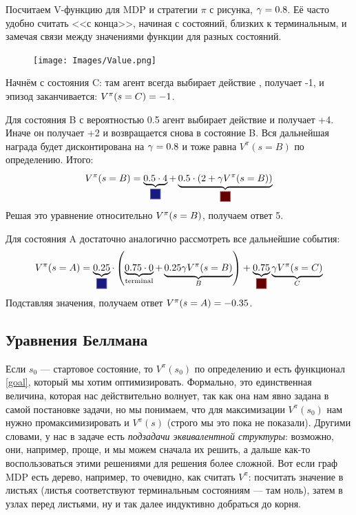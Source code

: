 \begin{exampleBox}[label=ex:vfunction]{}
Посчитаем V-функцию для MDP и стратегии $\pi$ с рисунка, $\gamma \HM= 0.8$. Её часто удобно считать <<с конца>>, начиная с состояний, близких к терминальным, и замечая связи между значениями функции для разных состояний.

\begin{figure}
\vspace{-0.7cm}
\centering
\texttt{[image: Images/Value.png]}
\vspace{-1.5cm}
\end{figure}

Начнём с состояния C: там агент всегда выбирает действие , получает -1, и эпизод заканчивается: $V^{\pi}(s \HM= C) \HM= -1$.

Для состояния B с вероятностью 0.5 агент выбирает действие  и получает +4. Иначе он получает +2 и возвращается снова в состояние B. Вся дальнейшая награда будет дисконтирована на $\gamma \HM= 0.8$ и тоже равна $V^{\pi}(s = B)$ по определению. Итого:
$$V^{\pi}(s = B) = \underbrace{0.5 \cdot 4}_{\text{\colorsquare{ChadBlue}}} + \underbrace{0.5 \cdot \left(2 + \gamma V^{\pi}(s = B)\right)}_{\text{\colorsquare{ChadRed}}}$$
Решая это уравнение относительно $V^{\pi}(s \HM= B)$, получаем ответ 5.

Для состояния A достаточно аналогично рассмотреть все дальнейшие события:
$$V^{\pi}(s = A) = \underbrace{0.25}_{\text{\colorsquare{ChadBlue}}} \cdot \left(\underbrace{0.75 \cdot 0}_{\text{terminal}} + \underbrace{0.25 \gamma V^{\pi}(s = B)}_{B} \right) + \underbrace{0.75}_{\text{\colorsquare{ChadRed}}} \underbrace{\gamma V^{\pi}(s = C)}_{C}$$
Подставляя значения, получаем ответ $V^{\pi}(s \HM= A) \HM= -0.35$.
\end{exampleBox}

\subsection{Уравнения Беллмана}

Если $s_0$ --- стартовое состояние, то $V^\pi(s_0)$ по определению и есть функционал \eqref{goal}, который мы хотим оптимизировать. Формально, это единственная величина, которая нас действительно волнует, так как она нам явно задана в самой постановке задачи, но мы понимаем, что для максимизации $V^\pi(s_0)$ нам нужно промаксимизировать и $V^{\pi}(s)$ (строго мы это пока не показали). Другими словами, у нас в задаче есть \emph{подзадачи эквивалентной структуры}: возможно, они, например, проще, и мы можем сначала их решить, а дальше как-то воспользоваться этими решениями для решения более сложной. Вот если граф MDP есть дерево, например, то очевидно, как считать $V^\pi$: посчитать значение в листьях (листья соответствуют терминальным состояниям --- там ноль), затем в узлах перед листьями, ну и так далее индуктивно добраться до корня.

